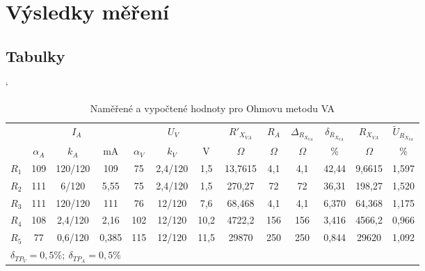 \documentclass[a4paper, czech]{article}
\begin{document}
\pagebreak

\section{Výsledky měření}

\subsection{Tabulky}

\begin{table}[H]
    \catcode`
    \centering
    \caption{Naměřené a vypočtené hodnoty pro Ohmovu metodu VA}
    \begin{tabular}{lcccccccccccc}
        \toprule
        \multirow{2}{*}{} & \multicolumn{3}{c}{$I_A$} & \multicolumn{3}{c}{$U_V$} & $R'_{X_{VA}}$ & $R_A$ & $\Delta_{R_{X_{VA}}}$ & $\delta_{R_{X_{VA}}}$ & $R_{X_{VA}}$ & $\tilde{U}_{R_{X_{VA}}}$ \\
        \cmidrule(rl){2-4}
        \cmidrule(rl){5-7}
        \cmidrule(rl){8-8}
        \cmidrule(rl){9-9}
        \cmidrule(rl){10-10}
        \cmidrule(rl){11-11}
        \cmidrule(rl){12-12}
        \cmidrule(rl){13-13}
        & $\alpha_A$   & $k_A$       & mA     & $\alpha_V$    & $k_V$       & V     & $\Omega$         & $\Omega$    & $\Omega$               & \%              & $\Omega$        & \%          \\
        \midrule
        $R_1$                & 109  & 120/120  & 109    & 75    & 2,4/120  & 1,5   & 13,7615   & 4,1  & 4,1             & 42,44           & 9,6615   & 1,597       \\
        $R_2$                & 111  & 6/120    & 5,55   & 75    & 2,4/120  & 1,5   & 270,27    & 72   & 72              & 36,31           & 198,27   & 1,520       \\
        $R_3$                & 111  & 120/120  & 111    & 76    & 12/120   & 7,6   & 68,468    & 4,1  & 4,1             & 6,370           & 64,368   & 1,175       \\
        $R_4$                & 108  & 2,4/120  & 2,16   & 102   & 12/120   & 10,2  & 4722,2    & 156  & 156             & 3,416           & 4566,2   & 0,966       \\
        $R_5$                & 77   & 0,6/120  & 0,385  & 115   & 12/120   & 11,5  & 29870     & 250  & 250             & 0,844           & 29620    & 1,092      \\
        \bottomrule
        \multicolumn{12}{l}{$\delta_{TP_V} = 0,5\%;\ \delta_{TP_A} = 0,5\%$}
    \end{tabular}
\end{table}
\end{document}
